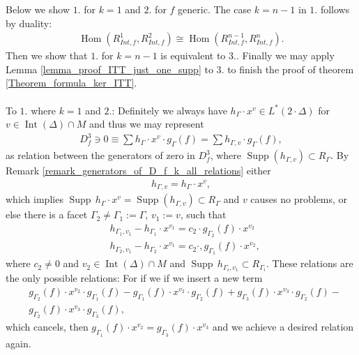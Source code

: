 \documentclass[12pt, english]{article}
\DeclareMathOperator{\Hom}{Hom}
\DeclareMathOperator{\Int}{Int}
\DeclareMathOperator{\Supp}{Supp}
\begin{document}
Below we show $1.$ for $k=1$ and $2.$ for $f$ generic. The case $k = n-1$ in $1.$ follows by duality:
\begin{align*}
	\Hom(R_{Int,f}^1,R_{Int,f}^2) \cong \Hom(R_{Int,f}^{n-1},R_{Int,f}^n).
\end{align*}
Then we show that $1$. for $k=n-1$ is equivalent to $3.$. Finally we may apply Lemma \ref{lemma_proof_ITT_just_one_supp} to $3.$ to finish the proof of theorem \ref{Theorem_formula_ker_ITT}.
\leavevmode
\\ \\
To $1.$ where $k=1$ and $2.$: Definitely we always have $h_{\Gamma} \cdot x^v \in L^*(2 \cdot \Delta)$ for $v \in \Int(\Delta) \cap M$ and thus we may represent 
\begin{align*}
	D_f^3 \ni 0 \equiv \sum h_{\Gamma} \cdot x^v \cdot g_{\Gamma}(f) = \sum h_{\Gamma,v} \cdot g_{\Gamma}(f),
\end{align*}
as relation between the generators of zero in $D_f^3$, where $\Supp(h_{\Gamma,v}) \subset R_{\Gamma}$. By Remark \ref{remark_generators_of_D_f_k_all_relations} either 
\begin{align} \label{equation_h_Gamma_beginning_form}
	h_{\Gamma,v} = h_{\Gamma} \cdot x^v,
\end{align}
which implies $\Supp \, h_{\Gamma} \cdot x^v = \Supp(h_{\Gamma,v}) \subset R_{\Gamma}$ and $v$ causes no problems, or else there is a facet $\Gamma_2 \neq \Gamma_1:= \Gamma$, $v_1:=v$, such that
\begin{align}
	& h_{\Gamma_1,v_1} - h_{\Gamma_1} \cdot x^{v_1} = c_2 \cdot g_{\Gamma_2}(f) \cdot x^{v_2} \label{equation_relation_in_D_f_k_first} \\
	& h_{\Gamma_2,v_1} - h_{\Gamma_2} \cdot x^{v_1} = c_2 \cdot, g_{\Gamma_1}(f) \cdot x^{v_2}, \label{equation_relation_in_D_f_k_second}
\end{align}
where $c_2 \neq 0$ and $v_2 \in \Int(\Delta) \cap M$ and $\Supp \, h_{\Gamma_i,v_1} \subset R_{\Gamma_i}$. These relations are the only possible relations: For if we if we insert a new term
\begin{align*}
	&g_{\Gamma_2}(f) \cdot x^{v_2} \cdot g_{\Gamma_1}(f) - g_{\Gamma_1}(f) \cdot x^{v_2} \cdot g_{\Gamma_2}(f) + g_{\Gamma_3}(f) \cdot x^{v_3} \cdot g_{\Gamma_2}(f) - \\
	&g_{\Gamma_2}(f) \cdot x^{v_3} \cdot g_{\Gamma_3}(f),
\end{align*}
which cancels, then $g_{\Gamma_1}(f) \cdot x^{v_2} = g_{\Gamma_3}(f) \cdot x^{v_3}$ and we achieve a desired relation again. 
\leavevmode 
\end{document}
